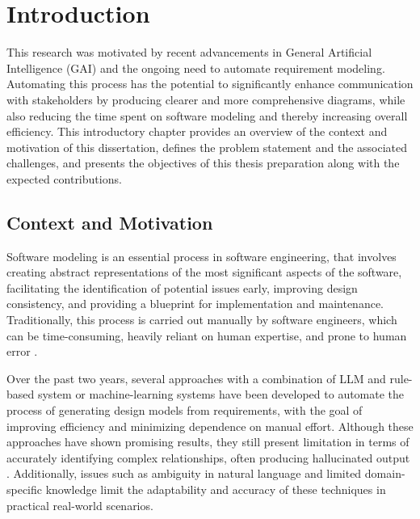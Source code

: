 
%

\chapter{Introduction}
\label{cha:introduction}


\epigraphfontsize{\small\itshape}
\setlength\epigraphwidth{12.5cm}
\setlength\epigraphrule{0pt}


This research was motivated by recent advancements in General Artificial Intelligence (GAI) and the ongoing need to automate requirement modeling. Automating this process has the potential to significantly enhance communication with stakeholders by producing clearer and more comprehensive diagrams, while also reducing the time spent on software modeling and thereby increasing overall efficiency.
This introductory chapter provides an overview of the context and motivation of this dissertation, defines the problem statement and the associated challenges, and presents the objectives of this thesis preparation along with the expected contributions.

\section{Context and Motivation}
\label{sec:context_and_motivation}
Software modeling is an essential process in software engineering, that involves creating abstract representations of the most significant aspects of the software, facilitating the identification of potential issues early, improving design consistency, and providing a blueprint for implementation and maintenance. Traditionally, this process is carried out manually by software engineers, which can be time-consuming, heavily reliant on human expertise, and prone to human error \cite{10chen2023}. 

Over the past two years, several approaches with a combination of LLM and rule-based system \cite{4jahan2024} or machine-learning systems \cite{2babaalla2024} have been developed to automate the process of generating design models from requirements, with the goal of improving efficiency and minimizing dependence on manual effort. 
Although these approaches have shown promising results, they still present limitation in terms of accurately identifying complex relationships, often producing hallucinated output \cite{miranda2024towards}. Additionally, issues such as ambiguity in natural language \cite{5ferrari2024} and limited domain-specific knowledge \cite{9ruan2023} limit the adaptability and accuracy of these techniques in practical real-world scenarios. 

